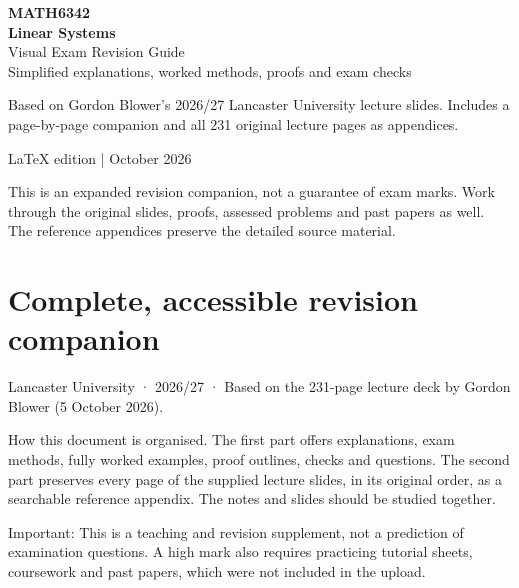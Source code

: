 \documentclass[11pt,a4paper]{article}
\begin{document}
\begin{titlepage}\pagecolor{navy}\color{white}\vspace*{32mm}\begin{center}
{\Huge\bfseries MATH6342\\[4mm] Linear Systems}\\[14mm]
{\Large Visual Exam Revision Guide}\\[8mm]
{\large Simplified explanations, worked methods, proofs and exam checks}\\[22mm]
\begin{tcolorbox}[colback=white,colframe=white,width=.87\textwidth]\color{navy}\large Based on Gordon Blower's 2026/27 Lancaster University lecture slides. Includes a page-by-page companion and all 231 original lecture pages as appendices.\end{tcolorbox}
\vfill {\large LaTeX edition | October 2026}\end{center}\end{titlepage}\nopagecolor\color{black}
\tableofcontents\newpage
\begin{studybox}This is an expanded revision companion, not a guarantee of exam marks. Work through the original slides, proofs, assessed problems and past papers as well. The reference appendices preserve the detailed source material.\end{studybox}

\section{Complete, accessible revision companion}
\begin{conceptbox}Lancaster University · 2026/27 · Based on the 231-page lecture deck by Gordon Blower (5 October 2026).\end{conceptbox}
\begin{conceptbox}How this document is organised. The first part offers explanations, exam methods, fully worked examples, proof outlines, checks and questions. The second part preserves every page of the supplied lecture slides, in its original order, as a searchable reference appendix. The notes and slides should be studied together.\end{conceptbox}
\begin{conceptbox}Important: This is a teaching and revision supplement, not a prediction of examination questions. A high mark also requires practicing tutorial sheets, coursework and past papers, which were not included in the upload.\end{conceptbox}
\end{document}
